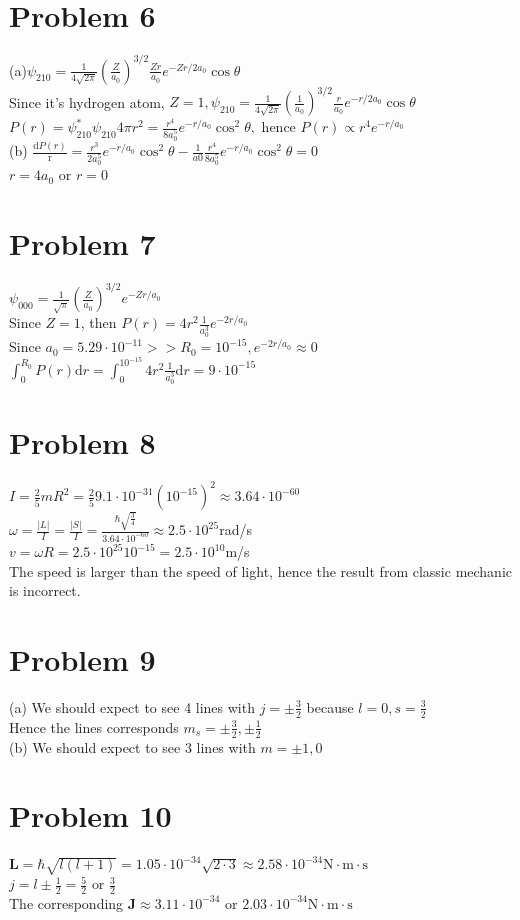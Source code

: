 \documentclass[a4paper]{article}
\begin{document}
\section{Problem 6}
\noindent (a)$\psi_{210}=\frac{1}{4\sqrt{2\pi}}(\frac{Z}{a_0})^{3/2}\frac{Zr}{a_0}e^{-Zr/2a_0}\cos\theta$
\\Since it's hydrogen atom, $Z=1,\psi_{210}=\frac{1}{4\sqrt{2\pi}}(\frac{1}{a_0})^{3/2}\frac{r}{a_0}e^{-r/2a_0}\cos\theta$
\\$P(r)=\psi_{210}^*\psi_{210}4\pi r^2=\frac{r^4}{8a_0^5}e^{-r/a_0}\cos^2\theta,$ hence $P(r)\propto r^4e^{-r/a_0}$
\\(b) $\frac{\mathrm{d}P(r)}{\mathrm{r}}=\frac{r^3}{2a_0^5}e^{-r/a_0}\cos^2\theta-\frac{1}{a0}\frac{r^4}{8a_0^5}e^{-r/a_0}\cos^2\theta=0$
\\ $r=4a_0\text{ or }r=0$
\section{Problem 7}
\noindent $\psi_{000}=\frac{1}{\sqrt{\pi}}(\frac{Z}{a_0})^{3/2}e^{-Zr/a_0}$
\\Since $Z=1$, then $P(r)=4r^2\frac{1}{a_0^3}e^{-2r/a_0}$
\\Since $a_0=5.29\cdot10^{-11}>>R_0=10^{-15},e^{-2r/a_0}\approx0$
\\$\int_0^{R_0}P(r)\mathrm{d}r=\int_0^{10^{-15}}4r^2\frac{1}{a_0^3}\mathrm{d}r=9\cdot10^{-15}$
\section{Problem 8}
\noindent $I=\frac{2}{5}mR^2=\frac{2}{5}9.1\cdot10^{-31}(10^{-15})^2\approx3.64\cdot10^{-60}$
\\$\omega=\frac{|L|}{I}=\frac{|S|}{I}=\frac{\hbar\sqrt{\frac{3}{4}}}{3.64\cdot10^{-60}}\approx2.5\cdot10^{25}$rad/s
\\$v=\omega R=2.5\cdot10^{25}10^{-15}=2.5\cdot10^{10}$m/s
\\The speed is larger than the speed of light, hence the result from classic mechanic is incorrect.
\section{Problem 9}
\noindent (a) We should expect to see 4 lines with $j=\pm\frac{3}{2}$ because $l=0,s=\frac{3}{2}$
\\Hence the lines corresponds $m_s=\pm\frac{3}{2},\pm\frac{1}{2}$
\\ (b) We should expect to see 3 lines with $m=\pm1,0$ 
\section{Problem 10}
\noindent $\textbf{L}=\hbar\sqrt{l(l+1)}=1.05\cdot10^{-34}\sqrt{2\cdot3}\approx2.58\cdot10^{-34}\text{N}\cdot\text{m}\cdot\text{s}$
\\$j=l\pm\frac{1}{2}=\frac{5}{2}\text{ or }\frac{3}{2}$
\\The corresponding $\textbf{J}\approx3.11\cdot10^{-34}\text{ or }2.03\cdot10^{-34}\text{N}\cdot\text{m}\cdot\text{s}$   
\end{document}
